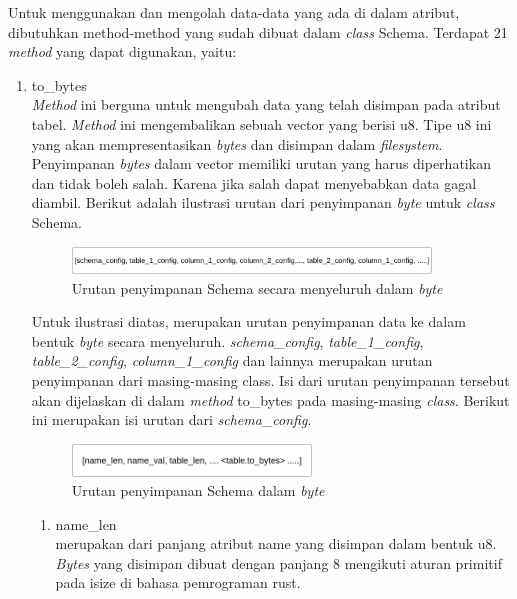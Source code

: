 Untuk menggunakan dan mengolah data-data yang ada di dalam atribut, dibutuhkan method-method yang sudah dibuat dalam \emph{class} Schema. Terdapat 21 \emph{method} yang dapat digunakan, yaitu:

\begin{enumerate}
	\item to\_bytes \\
  \emph{Method} ini berguna untuk mengubah data yang telah disimpan pada atribut tabel. \emph{Method} ini mengembalikan sebuah vector yang berisi u8. Tipe u8 ini yang akan mempresentasikan 
  \emph{bytes} dan disimpan dalam \emph{filesystem}. Penyimpanan \emph{bytes} dalam vector memiliki urutan yang harus diperhatikan dan tidak boleh salah. Karena jika salah dapat menyebabkan data gagal
  diambil. Berikut adalah ilustrasi urutan dari penyimpanan \emph{byte} untuk \emph{class} Schema.

  \begin{figure}[H]
	\centering{}
		\includegraphics[width=0.9\textwidth]{gambar/bab4/urutan-penyimpanan-secara-keseluruhan.png}
	\caption{Urutan penyimpanan Schema secara menyeluruh dalam \emph{byte}}
	\end{figure}

	Untuk ilustrasi diatas, merupakan urutan penyimpanan data ke dalam bentuk \emph{byte} secara menyeluruh. \emph{schema\_config}, 
	\emph{table\_1\_config}, \emph{table\_2\_config}, \emph{column\_1\_config} dan lainnya merupakan urutan penyimpanan dari masing-masing class.
	Isi dari urutan penyimpanan tersebut akan dijelaskan di dalam \emph{method} to\_bytes pada masing-masing \emph{class}. Berikut ini merupakan isi urutan dari
	\emph{schema\_config}.

  \begin{figure}[H]
	\centering{}
		\includegraphics[width=0.6\textwidth]{gambar/bab4/urutan-penyimpanan-skema.png}
	\caption{Urutan penyimpanan Schema dalam \emph{byte}}
	\end{figure}


	\begin{enumerate}
		\item name\_len \\
		merupakan dari panjang atribut name yang disimpan dalam bentuk u8. \emph{Bytes} yang disimpan dibuat dengan panjang 8 mengikuti aturan primitif pada isize di bahasa pemrograman rust.
		

\end{enumerate}
\end{enumerate}
